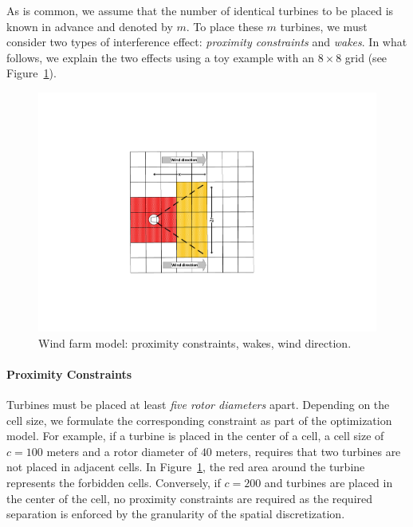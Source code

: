 \documentclass[preprint,12pt]{elsarticle}
\begin{document}
As is common, we assume that the number of identical turbines to be placed is known 
in advance and denoted by $m$. To place these $m$ turbines, 
we must consider two types of interference effect: \emph{proximity constraints} and \emph{wakes}.
In what follows, we explain the two effects using a toy example with an 
$8\times8$ grid (see Figure~\ref{fig:field_model}).

\begin{figure}[t]
	\centering
	\includegraphics[scale = 0.9]{field_model.pdf}

	\caption{Wind farm model: proximity constraints, wakes, wind direction.}\label{fig:field_model}
\end{figure}



\paragraph{Proximity Constraints}
Turbines must be placed at least \emph{five rotor diameters}
apart. Depending on the cell size, we formulate the
corresponding constraint as part of the optimization model. For
example, if a turbine is placed in the center of a
cell, a cell size of $c = 100$ meters and a rotor diameter
of $40$ meters, requires that two turbines are not placed in adjacent cells. In Figure~\ref{fig:field_model}, the red area
around the turbine represents the forbidden cells. Conversely, if $c = 200$ and turbines are placed in the center of the cell, no proximity constraints are required as the required separation is enforced by the granularity of the spatial discretization.
	 
\end{document}
